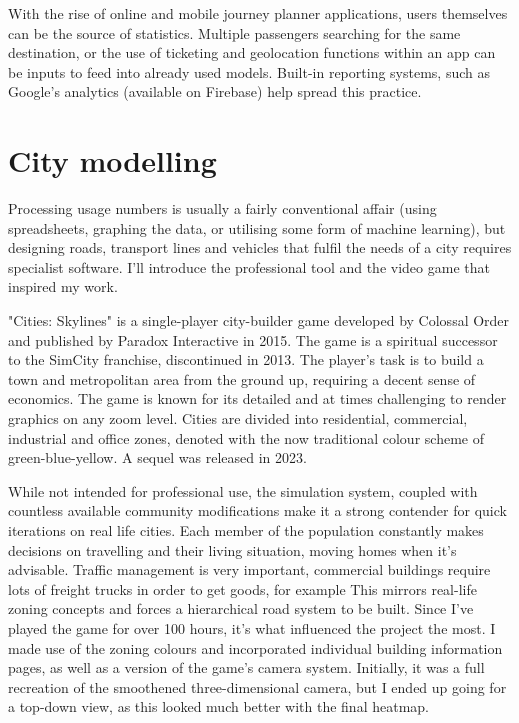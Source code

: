 With the rise of online and mobile journey planner applications, users themselves can be the source of statistics. Multiple passengers searching for the same destination, or the use of ticketing and geolocation functions within an app can be inputs to feed into already used models. Built-in reporting systems, such as Google's analytics (available on Firebase) help spread this practice.

\section{City modelling}

Processing usage numbers is usually a fairly conventional affair (using spreadsheets, graphing the data, or utilising some form of machine learning), but designing roads, transport lines and vehicles that fulfil the needs of a city requires specialist software. I'll introduce the professional tool and the video game that inspired my work.

"Cities: Skylines" is a single-player city-builder game developed by Colossal Order and published by Paradox Interactive in 2015. The game is a spiritual successor to the SimCity franchise, discontinued in 2013. The player's task is to build a town and metropolitan area from the ground up, requiring a decent sense of economics. The game is known for its detailed and at times challenging to render graphics on any zoom level. Cities are divided into residential, commercial, industrial and office zones, denoted with the now traditional colour scheme of green-blue-yellow. A sequel was released in 2023.

While not intended for professional use, the simulation system, coupled with countless available community modifications make it a strong contender for quick iterations on real life cities. Each member of the population constantly makes decisions on travelling and their living situation, moving homes when it's advisable. Traffic management is very important, commercial buildings require lots of freight trucks in order to get goods, for example This mirrors real-life zoning concepts and forces a hierarchical road system to be built. Since I've played the game for over 100 hours, it's what influenced the project the most. I made use of the zoning colours and incorporated individual building information pages, as well as a version of the game's camera system. Initially, it was a full recreation of the smoothened three-dimensional camera, but I ended up going for a top-down view, as this looked much better with the final heatmap.

